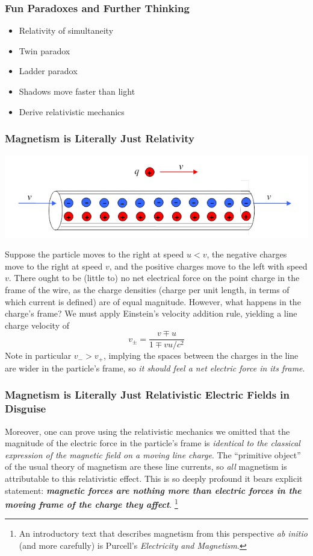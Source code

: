 \documentclass[10pt]{beamer}
\begin{document}
\begin{frame}
  \frametitle{Fun Paradoxes and Further Thinking}
  \begin{itemize}
  \item Relativity of simultaneity
  \item Twin paradox
  \item Ladder paradox
  \item Shadows move faster than light
  \item Derive relativistic mechanics
  \end{itemize}
\end{frame}
\begin{frame}
  \frametitle{Magnetism is Literally Just Relativity}
  \begin{center}
    \includegraphics[scale=0.5]{charge.png}
  \end{center}
  Suppose the particle moves to the right at speed $u<v$, the negative charges move to the right at speed $v$, and the positive charges move to the left with speed $v$.
  There ought to be (little to) no net electrical force on the point charge in the frame of the wire, as the charge densities (charge per unit length, in terms of which current is defined) are of equal magnitude.
  However, what happens in the charge's frame?
  We must apply Einstein's velocity addition rule, yielding a line charge velocity of
  \[
    v_{\pm}=\frac{v\mp u}{1\mp vu/c^{2}}
  \]
  Note in particular $v_{-}>v_{+}$, implying the spaces between the charges in the line are wider in the particle's frame, so \textit{it should feel a net electric force in its frame}.

\end{frame}

\begin{frame}
  \frametitle{Magnetism is Literally Just Relativistic Electric Fields in Disguise}
  Moreover, one can prove using the relativistic mechanics we omitted that the magnitude of the electric force in the particle's frame is \textit{identical to the classical expression of the magnetic field on a moving line charge}.
  The ``primitive object'' of the usual theory of magnetism are these line currents, so \textit{all} magnetism is attributable to this relativistic effect.
  This is so deeply profound it bears explicit statement: \textbf{\textit{magnetic forces are nothing more than electric forces in the moving frame of the charge they affect}}.
  \footnote{An introductory text that describes magnetism from this perspective \textit{ab initio} (and more carefully) is Purcell's \textit{Electricity and Magnetism}.}
\end{frame}
\end{document}
